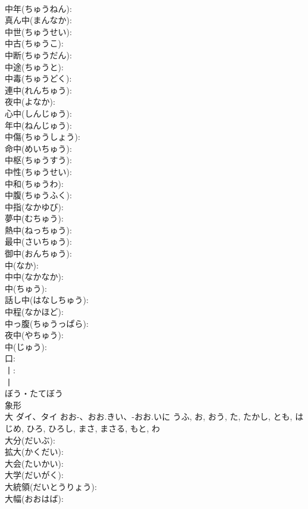 \documentclass[8pt]{extreport}
\begin{document}
\begin{CJK}{UTF8}{min}
\\	中年(ちゅうねん): 
\\	真ん中(まんなか): 
\\	中世(ちゅうせい): 
\\	中古(ちゅうこ): 
\\	中断(ちゅうだん): 
\\	中途(ちゅうと): 
\\	中毒(ちゅうどく): 
\\	連中(れんちゅう): 
\\	夜中(よなか): 
\\	心中(しんじゅう): 
\\	年中(ねんじゅう): 
\\	中傷(ちゅうしょう): 
\\	命中(めいちゅう): 
\\	中枢(ちゅうすう): 
\\	中性(ちゅうせい): 
\\	中和(ちゅうわ): 
\\	中腹(ちゅうふく): 
\\	中指(なかゆび): 
\\	夢中(むちゅう): 
\\	熱中(ねっちゅう): 
\\	最中(さいちゅう): 
\\	御中(おんちゅう): 
\\	中(なか): 
\\	中中(なかなか): 
\\	中(ちゅう): 
\\	話し中(はなしちゅう): 
\\	中程(なかほど): 
\\	中っ腹(ちゅうっぱら): 
\\	夜中(やちゅう): 
\\	中(じゅう): 
\\	口: 
\\	丨: 
\\	丨	
\\	ぼう・たてぼう	
\\	象形 
\\	大	ダイ、タイ	おお-、おお.きい、-おお.いに	うふ, お, おう, た, たかし, とも, はじめ, ひろ, ひろし, まさ, まさる, もと, わ	
\\	大分(だいぶ): 
\\	拡大(かくだい): 
\\	大会(たいかい): 
\\	大学(だいがく): 
\\	大統領(だいとうりょう): 
\\	大幅(おおはば): 

\end{CJK}
\end{document}
